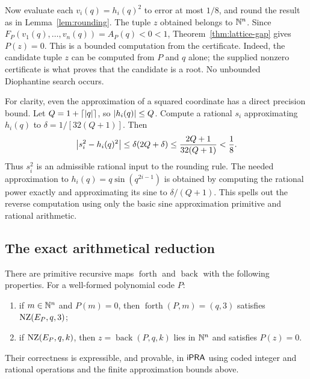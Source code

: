 Now evaluate each $v_i(q)=h_i(q)^2$ to error at most $1/8$, and round the
result as in Lemma~\ref{lem:rounding}. The tuple $z$ obtained belongs to
$\mathbb N^n$. Since
$F_P(v_1(q),\ldots,v_n(q))=A_P(q)<0<1$, Theorem~\ref{thm:lattice-gap}
gives $P(z)=0$. This is a bounded computation from the certificate.
Indeed, the candidate tuple $z$ can be computed from $P$ and $q$ alone;
the supplied nonzero certificate is what proves that the candidate is a
root. No unbounded Diophantine search occurs.

For clarity, even the approximation of a squared coordinate has a direct
precision bound. Let $Q=1+\lceil\left|q\right|\rceil$, so
$\left|h_i(q)\right|\le Q$. Compute a rational $s_i$ approximating $h_i(q)$
to $\delta=1/[32(Q+1)]$. Then
\[
 \left|s_i^2-h_i(q)^2\right|
 \le\delta(2Q+\delta)
 \le\frac{2Q+1}{32(Q+1)}<\frac18.
\]
Thus $s_i^2$ is an admissible rational input to the rounding rule. The
needed approximation to $h_i(q)=q\sin(q^{2i-1})$ is obtained by computing
the rational power exactly and approximating its sine to
$\delta/(Q+1)$. This spells out the reverse computation using only the
basic sine approximation primitive and rational arithmetic.

\subsection{The exact arithmetical reduction}

\begin{theorem}\label{thm:witness-maps}
There are primitive recursive maps $\operatorname{forth}$ and
$\operatorname{back}$ with the following properties. For a well-formed
polynomial code $P$:
\begin{enumerate}
\item if $m\in\mathbb N^n$ and $P(m)=0$, then
      $\operatorname{forth}(P,m)=(q,3)$ satisfies $\operatorname{NZ}(E_P,q,3)$;
\item if $\operatorname{NZ}(E_P,q,k)$, then
      $z=\operatorname{back}(P,q,k)$ lies in $\mathbb N^n$ and satisfies
      $P(z)=0$.
\end{enumerate}
Their correctness is expressible, and provable, in $\mathsf{iPRA}$ using coded
integer and rational operations and the finite approximation bounds above.
\end{theorem}

